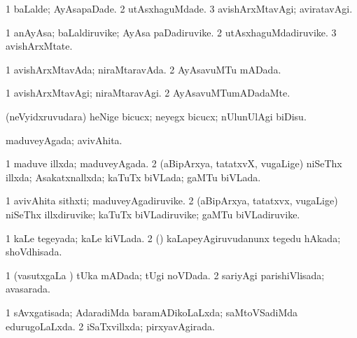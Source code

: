 {{\bentry
{} 
\gl{\kirxvi}
\expl{}
\bmng
\bnum
\num{1} baLalde; AyAsapaDade. 
\num{2} utAsxhaguMdade. 
\num{3} avishArxMtavAgi; aviratavAgi. 
\enum
\emng
\eentry

\bentry
{} 
\gl{\nA}
\expl{}
\bmng
\bnum
\num{1} anAyAsa; baLaldiruvike; AyAsa paDadiruvike. 
\num{2} utAsxhaguMdadiruvike. 
\num{3} avishArxMtate. 
\enum
\emng
\eentry

\bentry
{} 
\gl{\gu}
\expl{}
\bmng
{} 
\emng
\eentry

\bentry
{} 
\gl{\gu}
\expl{}
\bmng
\bnum
\num{1} avishArxMtavAda; niraMtaravAda. 
\num{2} AyAsavuMTu mADada. 
\enum
\emng
\eentry

\bentry
{} 
\gl{\kirxvi}
\expl{}
\bmng
\bnum
\num{1} avishArxMtavAgi; niraMtaravAgi. 
\num{2} AyAsavuMTumADadaMte. 
\enum
\emng
\eentry

\bentry
{} 
\gl{\sakirx}
\expl{}
\bmng
(neVyidxruvudara) heNige bicucx; neyegx bicucx; nUlunUlAgi biDisu. 
\emng
\eentry

\bentry
{} 
\gl{\gu}
\expl{}
\bmng
maduveyAgada; avivAhita. 
\emng
\eentry

\bentry
{} 
\gl{\gu}
\expl{}
\bmng
\bnum
\num{1} maduve illxda; maduveyAgada. 
\num{2} (aBipArxya, tatatxvX, \mo vugaLige) niSeThx illxda; Asakatxnallxda; kaTuTx biVLada; gaMTu biVLada. 
\enum
\emng
\eentry

\bentry
{} 
\gl{\nA}
\expl{}
\bmng
\bnum
\num{1} avivAhita sithxti; maduveyAgadiruvike. 
\num{2} (aBipArxya, tatatxvx, \mo vugaLige) niSeThx illxdiruvike; kaTuTx biVLadiruvike; gaMTu biVLadiruvike. 
\enum
\emng
\eentry

\bentry
{} 
\gl{\gu}
\expl{}
\bmng
\bnum
\num{1} kaLe tegeyada; kaLe kiVLada. 
\num{2} (\rUpa) kaLapeyAgiruvudanunx tegedu hAkada; shoVdhisada. 
\enum
\emng
\eentry

\bentry
{} 
\gl{\gu}
\expl{}
\bmng
\bnum
\num{1} (vasutxgaLa \vi) tUka mADada; tUgi noVDada. 
\num{2} sariyAgi parishiVlisada; avasarada. 
\enum
\emng
\eentry

\bentry
{} 
\gl{\gu}
\expl{}
\bmng
\bnum
\num{1} sAvxgatisada; AdaradiMda baramADikoLaLxda; saMtoVSadiMda edurugoLaLxda. 
\num{2} iSaTxvillxda; pirxyavAgirada. 
\enum
\emng
\eentry

}}
